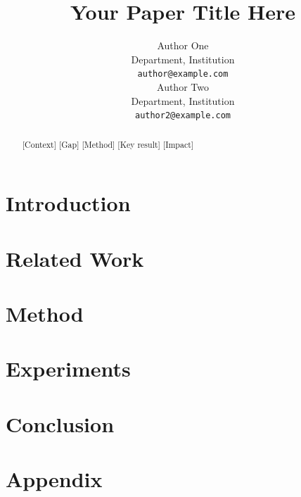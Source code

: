 \documentclass[11pt]{article}
\title{Your Paper Title Here}
\author{Author One \\ Department, Institution \\ \texttt{author@example.com} \\\And
  Author Two \\ Department, Institution \\ \texttt{author2@example.com}}
\begin{document}
\maketitle

\begin{abstract}
  [Context] [Gap] [Method] [Key result] [Impact]
\end{abstract}

\section{Introduction}
\section{Related Work}
\section{Method}
\section{Experiments}
\section{Conclusion}




\appendix
\section{Appendix}
\end{document}
